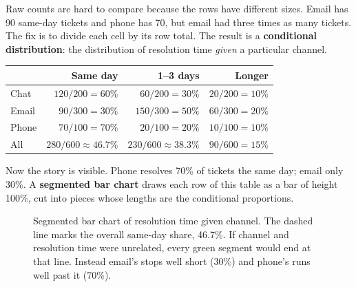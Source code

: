 Raw counts are hard to compare because the rows have different sizes. Email has
90 same-day tickets and phone has 70, but email had three times as many tickets.
The fix is to divide each cell by its row total. The result is a
\textbf{conditional distribution}: the distribution of resolution time
\emph{given} a particular channel.

\begin{center}
\begin{tabular}{lrrr}
\toprule
 & Same day & 1--3 days & Longer \\
\midrule
Chat  & $120/200 = 60\%$ & $60/200 = 30\%$ & $20/200 = 10\%$ \\
Email & $90/300 = 30\%$ & $150/300 = 50\%$ & $60/300 = 20\%$ \\
Phone & $70/100 = 70\%$ & $20/100 = 20\%$ & $10/100 = 10\%$ \\
\midrule
All   & $280/600 \approx 46.7\%$ & $230/600 \approx 38.3\%$ & $90/600 = 15\%$ \\
\bottomrule
\end{tabular}
\end{center}

Now the story is visible. Phone resolves 70\% of tickets the same day; email only
30\%. A \textbf{segmented bar chart} draws each row of this table as a bar of
height 100\%, cut into pieces whose lengths are the conditional proportions.

\begin{figure}[H]
\centering
{}
\caption{Segmented bar chart of resolution time given channel. The dashed line
marks the overall same-day share, 46.7\%. If channel and resolution time were
unrelated, every green segment would end at that line. Instead email's stops well
short (30\%) and phone's runs well past it (70\%).}
\label{fig:two-variables-segbar}
\end{figure}

